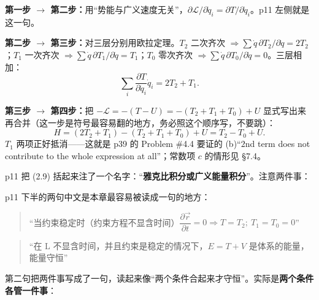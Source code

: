\documentclass[11pt]{ctexart}
\begin{document}
\textbf{第一步 $\to$ 第二步：}用“势能与广义速度无关”，$\partial\mathcal{L}/\partial\dot q_i=\partial T/\partial\dot q_i$。p11 左侧就是这一句。

\textbf{第二步 $\to$ 第三步：}对三层分别用欧拉定理。$T_2$ 二次齐次 $\Rightarrow\sum\dot q\,\partial T_2/\partial\dot q=2T_2$；$T_1$ 一次齐次 $\Rightarrow\sum\dot q\,\partial T_1/\partial\dot q=T_1$；$T_0$ 零次齐次 $\Rightarrow\sum\dot q\,\partial T_0/\partial\dot q=0$。三层相加：
\[
\sum_i\frac{\partial T}{\partial\dot q_i}\dot q_i=2T_2+T_1 . \tag{2.8}
\]

\textbf{第三步 $\to$ 第四步：}把 $-\mathcal{L}=-(T-U)=-(T_2+T_1+T_0)+U$ 显式写出来再合并（这一步是符号最容易翻的地方，务必照这个顺序写，不要跳）：
\[
H=(2T_2+T_1)-(T_2+T_1+T_0)+U=T_2-T_0+U . \tag{2.9}
\]
$T_1$ 两项正好抵消——这就是 p39 的 Problem \#4.4 要证的 (b)“$2$nd term does not contribute to the whole expression at all”；常数项 $c$ 的情形见 §7.4。

p11 把 (2.9) 括起来注了一个名字：“\textbf{雅克比积分或广义能量积分}”。注意两件事：



p11 下半的两句中文是本章最容易被读成一句的地方：

\begin{quote}
“当约束稳定时（约束方程不显含时间）$\dfrac{\partial\vec r}{\partial t}=0\Rightarrow T=T_2;\ T_1=T_0=0$”
\end{quote}
\begin{quote}
“在 L 不显含时间，并且约束是稳定的情况下，$E=T+V$ 是体系的能量，能量守恒”
\end{quote}

第二句把两件事写成了一句，读起来像“两个条件合起来才守恒”。实际是\textbf{两个条件各管一件事}：

\end{document}
